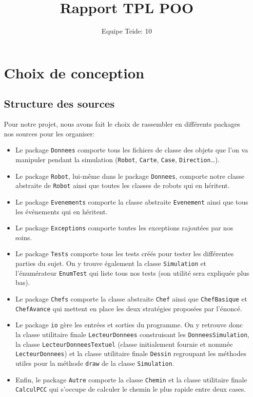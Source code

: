 \documentclass[a4paper,8pt]{article} %
\title{Rapport TPL POO}
\author{Equipe Teide: 10}
\date{} %
\begin{document}
\maketitle
\section{Choix de conception}
\subsection{Structure des sources} %
Pour notre projet, nous avons fait le choix de rassembler en différents packages nos sources pour les organiser: 
\begin{itemize}
    \item Le package \texttt{Donnees} comporte tous les fichiers de classe des objets que l'on va manipuler pendant
    la simulation (\texttt{Robot}, \texttt{Carte}, \texttt{Case}, \texttt{Direction}\ldots).
    \item Le package \texttt{Robot}, lui-même dans le package \texttt{Donnees}, comporte notre classe abstraite de \texttt{Robot} ainsi
    que toutes les classes de robots qui en héritent.
    \item Le package \texttt{Evenements} comporte la classe abstraite \texttt{Evenement} ainsi que tous les événements qui en héritent.
    \item Le package \texttt{Exceptions} comporte toutes les exceptions rajoutées par nos soins.
    \item Le package \texttt{Tests} comporte tous les tests créés pour tester les différentes parties du sujet. On y trouve également
    la classe \texttt{Simulation} et l'énumérateur \texttt{EnumTest} qui liste tous nos tests (son utilité sera expliquée plus bas).
    \item Le package \texttt{Chefs} comporte la classe abstraite \texttt{Chef} ainsi que \texttt{ChefBasique} et \texttt{ChefAvance} qui mettent
    en place les deux stratégies proposées par l'énoncé.
    \item Le package \texttt{io} gère les entrées et sorties du programme. 
    On y retrouve donc la classe utilitaire finale \texttt{LecteurDonnees} construisant les \texttt{DonneesSimulation}, la classe 
    \texttt{LecteurDonneesTextuel} (classe initialement fournie et nommée \texttt{LecteurDonnees}) et la classe utilitaire finale 
    \texttt{Dessin} regroupant les méthodes utiles pour la méthode \texttt{draw} de la classe \texttt{Simulation}. 
    \item Enfin, le package \texttt{Autre} comporte la classe \texttt{Chemin} et la classe utilitaire finale \texttt{CalculPCC} 
    qui s'occupe de calculer le chemin le plus rapide entre deux cases.
    
\end{itemize}
\end{document}
